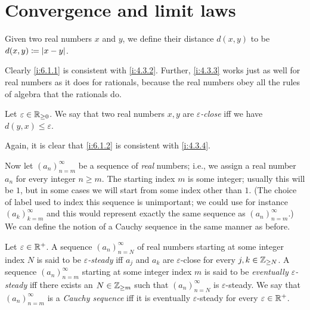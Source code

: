 \section{Convergence and limit laws}\label{i:sec:6.1}

\begin{defn}\label{i:6.1.1}
  Given two real numbers \(x\) and \(y\), we define their distance \(d(x, y)\) to be \(d(x, y) \coloneqq \left\lvert x - y\right\rvert\).
\end{defn}

\begin{note}
  Clearly \cref{i:6.1.1} is consistent with \cref{i:4.3.2}.
  Further, \cref{i:4.3.3} works just as well for real numbers as it does for rationals, because the real numbers obey all the rules of algebra that the rationals do.
\end{note}

\begin{defn}\label{i:6.1.2}
  Let \(\varepsilon \in \mathbb{R}_{\geq 0}\).
  We say that two real numbers \(x, y\) are \emph{\(\varepsilon\)-close} iff we have \(d(y, x) \leq \varepsilon\).
\end{defn}

\begin{note}
  Again, it is clear that \cref{i:6.1.2} is consistent with \cref{i:4.3.4}.
\end{note}

\begin{note}
  Now let \((a_n)_{n = m}^\infty\) be a sequence of \emph{real} numbers;
  i.e., we assign a real number \(a_n\) for every integer \(n \geq m\).
  The starting index \(m\) is some integer;
  usually this will be \(1\), but in some cases we will start from some index other than \(1\).
  (The choice of label used to index this sequence is unimportant; we could use for instance \((a_k)_{k = m}^{\infty}\) and this would represent exactly the same sequence as \((a_n)_{n = m}^{\infty}\).)
  We can define the notion of a Cauchy sequence in the same manner as before.
\end{note}

\begin{defn}\label{i:6.1.3}
  Let \(\varepsilon \in \mathbb{R}^+\).
  A sequence \((a_n)_{n = N}^\infty\) of real numbers starting at some integer index \(N\) is said to be \emph{\(\varepsilon\)-steady} iff \(a_j\) and \(a_k\) are \(\varepsilon\)-close for every \(j, k \in \mathbb{Z}_{\geq N}\).
  A sequence \((a_n)_{n = m}^\infty\) starting at some integer index \(m\) is said to be \emph{eventually \(\varepsilon\)-steady} iff there exists an \(N \in \mathbb{Z}_{\geq m}\) such that \((a_n)_{n = N}^\infty\) is \(\varepsilon\)-steady.
  We say that \((a_n)_{n = m}^\infty\) is a \emph{Cauchy sequence} iff it is eventually \(\varepsilon\)-steady for every \(\varepsilon \in \mathbb{R}^+\).
\end{defn}

